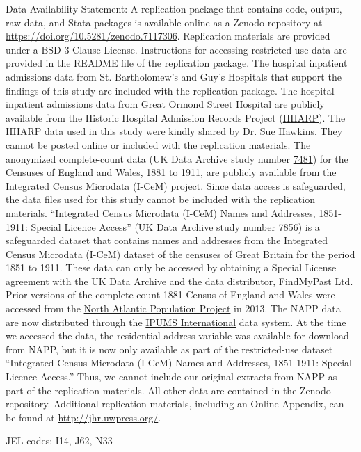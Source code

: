 \documentclass[12pt,english]{article}
\begin{document}
\begin{titlepage}
\begin{singlespace}
\noindent Data Availability Statement: A replication package that contains code, output, raw data, and Stata packages is available online as a Zenodo repository at \href{https://doi.org/10.5281/zenodo.7117306}{https://doi.org/10.5281/zenodo.7117306}. Replication materials are provided under a BSD 3-Clause License. Instructions for accessing restricted-use data are provided in the README file of the replication package. The hospital inpatient admissions data from St. Bartholomew's and Guy's Hospitals that support the findings of this study are included with the replication package. The hospital inpatient admissions data from Great Ormond Street Hospital are publicly available from the Historic Hospital Admission Records Project (\href{https://hharp.org/}{HHARP}). The HHARP data used in this study were kindly shared by \href{mailto:drsuehawkins@gmail.com}{Dr. Sue Hawkins}. They cannot be posted online or included with the replication materials. The anonymized complete-count data (UK Data Archive study number \href{https://beta.ukdataservice.ac.uk/datacatalogue/studies/study?id=7481#!/details}{7481}) for the Censuses of England and Wales, 1881 to 1911, are publicly available from the \href{https://icem.data-archive.ac.uk/#step1}{Integrated Census Microdata} (I-CeM) project. Since data access is \href{https://ukdataservice.ac.uk/find-data/access-conditions/}{safeguarded}, the data files used for this study cannot be included with the replication materials. ``Integrated Census Microdata (I-CeM) Names and Addresses, 1851-1911: Special Licence Access'' (UK Data Archive study number \href{https://beta.ukdataservice.ac.uk/datacatalogue/studies/study?id=7856#!/details}{7856}) is a safeguarded dataset that contains names and addresses from the Integrated Census Microdata (I-CeM) dataset of the censuses of Great Britain for the period 1851 to 1911. These data can only be accessed by obtaining a Special License agreement with the UK Data Archive and the data distributor, FindMyPast Ltd. Prior versions of the complete count 1881 Census of England and Wales were accessed from the \href{https://www.nappdata.org/napp/}{North Atlantic Population Project} in 2013. The NAPP data are now distributed through the \href{https://international.ipums.org/international/}{IPUMS International} data system. At the time we accessed the data, the residential address variable was available for download from NAPP, but it is now only available as part of the restricted-use dataset ``Integrated Census Microdata (I-CeM) Names and Addresses, 1851-1911: Special Licence Access.'' Thus, we cannot include our original extracts from NAPP as part of the replication materials. All other data are contained in the Zenodo repository. Additional replication materials, including an Online Appendix, can be found at \href{http://jhr.uwpress.org/}{http://jhr.uwpress.org/}.

\noindent JEL codes: I14, J62, N33

\end{singlespace}

\end{titlepage}
\setcounter{footnote}{0}
\end{document}
